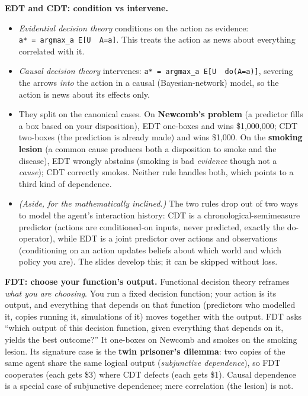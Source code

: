 \documentclass[11pt]{article}
\begin{document}
\textbf{EDT and CDT: condition vs intervene.}

\begin{itemize}
\item
  \emph{Evidential decision theory} conditions on the action as evidence: \texttt{a*\ =\ argmax\_a\ E{[}U\ \textbar{}\ A=a{]}}. This treats the action as news about everything correlated with it.
\item
  \emph{Causal decision theory} intervenes: \texttt{a*\ =\ argmax\_a\ E{[}U\ \textbar{}\ do(A=a){]}}, severing the arrows \emph{into} the action in a causal (Bayesian-network) model, so the action is news about its effects only.
\item
  They split on the canonical cases. On \textbf{Newcomb's problem} (a predictor fills a box based on your disposition), EDT one-boxes and wins \$1,000,000; CDT two-boxes (the prediction is already made) and wins \$1,000. On the \textbf{smoking lesion} (a common cause produces both a disposition to smoke and the disease), EDT wrongly abstains (smoking is bad \emph{evidence} though not a \emph{cause}); CDT correctly smokes. Neither rule handles both, which points to a third kind of dependence.
\item
  \emph{(Aside, for the mathematically inclined.)} The two rules drop out of two ways to model the agent's interaction history: CDT is a chronological-semimeasure predictor (actions are conditioned-on inputs, never predicted, exactly the do-operator), while EDT is a joint predictor over actions and observations (conditioning on an action updates beliefs about which world and which policy you are). The slides develop this; it can be skipped without loss.
\end{itemize}

\textbf{FDT: choose your function's output.} Functional decision theory reframes \emph{what you are choosing}. You run a fixed decision function; your action is its output, and everything that depends on that function (predictors who modelled it, copies running it, simulations of it) moves together with the output. FDT asks ``which output of this decision function, given everything that depends on it, yields the best outcome?'' It one-boxes on Newcomb and smokes on the smoking lesion. Its signature case is the \textbf{twin prisoner's dilemma}: two copies of the same agent share the same logical output (\emph{subjunctive dependence}), so FDT cooperates (each gets \$3) where CDT defects (each gets \$1). Causal dependence is a special case of subjunctive dependence; mere correlation (the lesion) is not.
\end{document}
